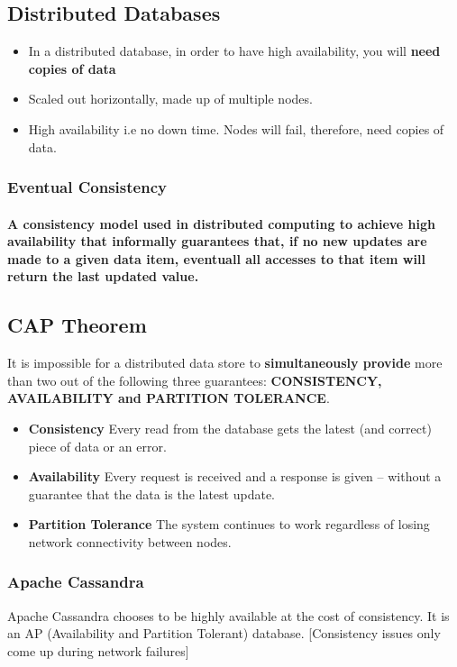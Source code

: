 \documentclass[
	paper=a4,%
	pagesize,%
	8pt, fleqn,%
	headings=small,%
	notitlepage,%
	parskip=never]%
	{scrreprt}
\begin{document}
\begin{multicols*}{3}
\subsection{Distributed Databases}
\begin{itemize}
\item In a distributed database, in order to have high availability, you will \textbf{need copies of data}
\item Scaled out horizontally, made up of multiple nodes.
\item High availability i.e no down time. Nodes will fail, therefore, need copies of data.

\end{itemize}

\subsubsection{Eventual Consistency}

\paragraph{A consistency model used in distributed computing to achieve high availability that informally guarantees that, if no new updates are made to a given data item, eventuall all accesses to that item will return the last updated value.}

\subsection{CAP Theorem}
It is impossible for a distributed data store to \textbf{simultaneously provide} more than two out of the following three guarantees: \textbf{CONSISTENCY, AVAILABILITY and PARTITION TOLERANCE}.

\begin{itemize}
\item \textbf{Consistency} Every read from the database gets the latest (and correct) piece of data or an error.
\item \textbf{Availability} Every request is received and a response is given -- without a guarantee that the data is the latest update.
\item \textbf{Partition Tolerance} The system continues to work regardless of losing network connectivity between nodes.
\end{itemize}

\subsubsection*{Apache Cassandra}
Apache Cassandra chooses to be highly available at the cost of consistency. It is an AP (Availability and Partition Tolerant) database. [Consistency issues only come up during network failures]


\end{multicols*}
\end{document}
